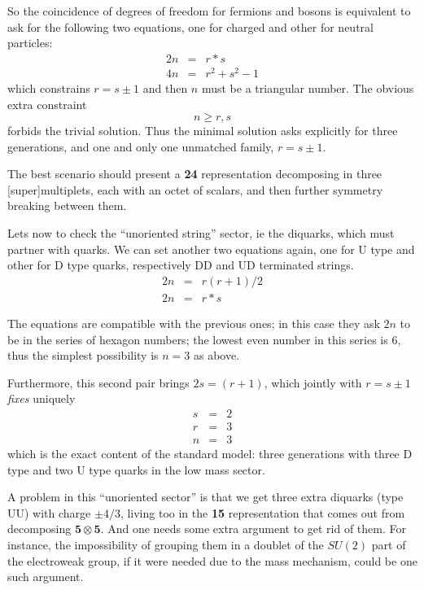 \documentclass[a4paper,10pt]{article}
\begin{document}
So the coincidence of degrees of freedom for fermions and bosons is equivalent to ask for the following two equations, one for charged and other for neutral particles:
\begin{eqnarray*}
2 n  &=&  r*s \\
4 n  &=&  r^2+s^2-1
\end{eqnarray*}
which constrains $r=s\pm 1$ and then $n$ must be a triangular number. The obvious extra constraint 
$$n \geq r,s $$
forbids the trivial solution. Thus the minimal solution asks explicitly for three generations, and one and only one
unmatched family, $r=s\pm 1$.

The best scenario should present a \textbf{24} representation decomposing in three [super]multiplets, each with an octet of scalars, and then further symmetry breaking between them.

Lets now to check the ``unoriented string'' sector, ie the diquarks, which must partner with quarks. We can set another two equations again, one for U type and other for D type quarks, respectively DD and UD terminated strings.
\begin{eqnarray*}
 2 n  &=& r(r+1)/2 \\
 2 n &=& r*s
\end{eqnarray*}

The equations are compatible with the previous ones; in this case they ask $2n$ to be in the series of hexagon numbers; the lowest even number in this series is $6$, thus the simplest possibility is $n=3$ as above. 

Furthermore, this second pair brings $2 s = (r+1)$, which jointly with $r=s\pm 1$ \textit{fixes} uniquely
\begin{eqnarray*}
 s &=& 2 \\
 r &=& 3 \\
 n &=& 3
\end{eqnarray*}
which is the exact content of the standard model: three generations with three D type and two U type quarks in the low mass sector.

A problem in this ``unoriented sector'' is that we get three extra diquarks (type UU) with charge $\pm 4/3$, living too in the \textbf{15} representation that comes out from decomposing ${\mathbf5} \otimes {\mathbf 5}$. And one needs some extra argument to get rid of them. For instance, the impossibility of grouping them in a doublet of the $SU(2)$ part of the electroweak group, if it were needed due to the mass mechanism, could be one such argument.
\end{document}
